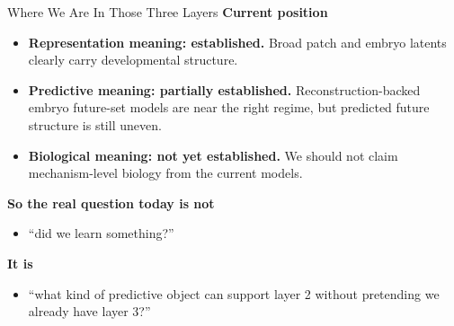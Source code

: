 \documentclass[aspectratio=169,11pt]{beamer}
\begin{document}
\begin{frame}{Where We Are In Those Three Layers}
\textbf{Current position}
\begin{itemize}
    \item \textbf{Representation meaning: established.}
    Broad patch and embryo latents clearly carry developmental structure.
    \item \textbf{Predictive meaning: partially established.}
    Reconstruction-backed embryo future-set models are near the right regime,
    but predicted future structure is still uneven.
    \item \textbf{Biological meaning: not yet established.}
    We should not claim mechanism-level biology from the current models.
\end{itemize}

\vspace{0.7em}
\textbf{So the real question today is not}
\begin{itemize}
    \item ``did we learn something?''
\end{itemize}

\textbf{It is}
\begin{itemize}
    \item ``what kind of predictive object can support layer 2 without pretending we already have layer 3?''
\end{itemize}
\end{frame}
\end{document}
